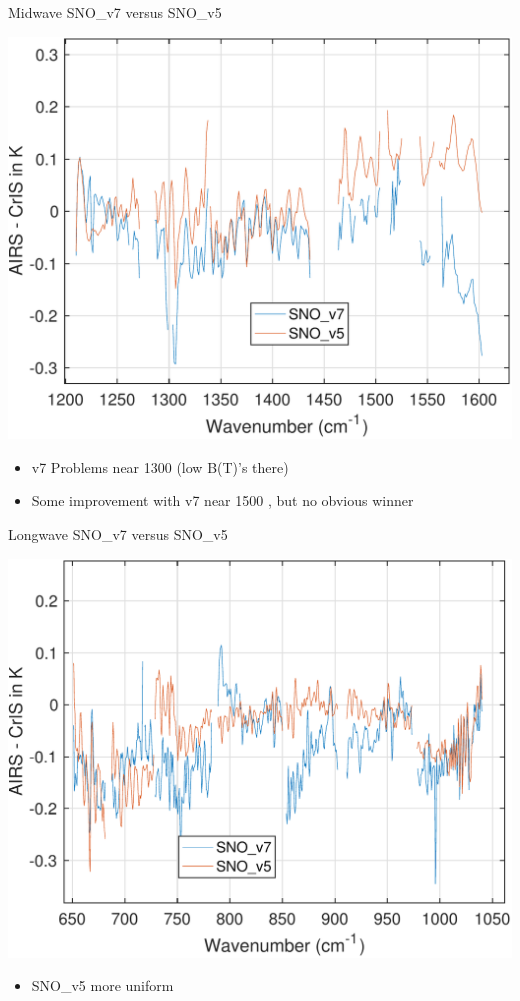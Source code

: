 \documentclass[10pt,t]{beamer}
\begin{document}
\begin{frame}[label={sec:orgd0928c9}]{Midwave SNO\_v7 versus SNO\_v5}
\vspace{-0.1in}
\begin{center}
\includegraphics[width=0.75\linewidth]{./Figs/Pdf/airs_v7_sno_and_airs_v5_sno_mw.pdf}
\end{center}

\vspace{-0.1in}
\begin{itemize}
\item v7 Problems near 1300 \wn (low B(T)'s there)
\item Some improvement with v7 near 1500 \wn, but no obvious winner
\end{itemize}
\end{frame}

\begin{frame}[label={sec:orgdddbacb}]{Longwave SNO\_v7 versus SNO\_v5}
\vspace{-0.1in}
\begin{center}
\includegraphics[width=0.75\linewidth]{./Figs/Pdf/airs_v7_sno_and_airs_v5_sno_lw.pdf}
\end{center}

\vspace{-0.1in}
\begin{itemize}
\item SNO\_v5 more uniform
\end{itemize}
\end{frame}
\end{document}
